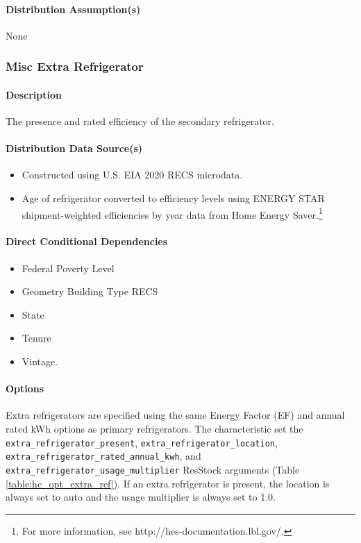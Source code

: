 \paragraph{Distribution Assumption(s)}
None

\subsubsection{Misc Extra Refrigerator}
\paragraph{Description}
The presence and rated efficiency of the secondary refrigerator.

\paragraph{Distribution Data Source(s)}
\begin{itemize}
\item 

Constructed using U.S. EIA 2020 RECS microdata. 
\item Age of refrigerator converted to efficiency levels using ENERGY STAR shipment-weighted efficiencies by year data from Home Energy Saver.\footnote{For more information, see http://hes-documentation.lbl.gov/.} %
\end{itemize}


\paragraph{Direct Conditional Dependencies}
\begin{itemize}
    \item Federal Poverty Level
    \item Geometry Building Type RECS
    \item State
    \item Tenure
    \item Vintage.
\end{itemize}

\paragraph{Options}
Extra refrigerators are specified using the same Energy Factor (EF) and annual rated kWh options as primary refrigerators.  The characteristic set the \texttt{extra\_refrigerator\_present}, \texttt{extra\_refrigerator\_location}, \texttt{extra\_refrigerator\_rated\_annual\_kwh}, and \texttt{extra\_refrigerator\_usage\_multiplier} ResStock arguments (Table \ref{table:hc_opt_extra_ref}). If an extra refrigerator is present, the location is always set to auto and the usage multiplier is always set to 1.0.

